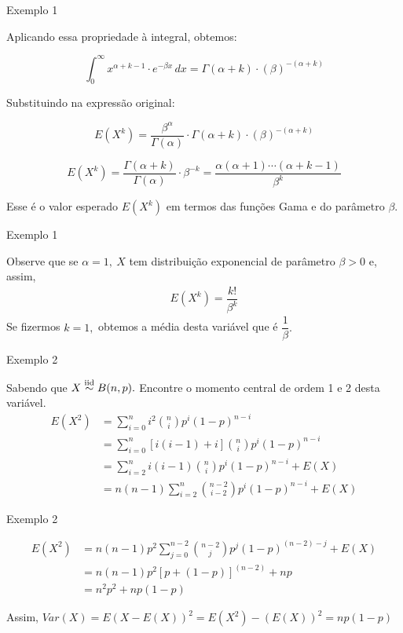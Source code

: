 \documentclass[12pt]{beamer}
\begin{document}
\begin{frame}{Exemplo 1}
\begin{block}{}
\justifying
Aplicando essa propriedade à integral, obtemos:

\[ \int_{0}^{\infty} x^{\alpha + k - 1} \cdot e^{-\beta x} \, dx = \Gamma(\alpha + k) \cdot (\beta)^{-(\alpha + k)} \]

Substituindo na expressão original:

\[E(X^k) = \frac{\beta^{\alpha}}{\Gamma(\alpha)} \cdot \Gamma(\alpha + k) \cdot (\beta)^{-(\alpha + k)} \]

\[E(X^k) = \frac{\Gamma(\alpha + k)}{\Gamma(\alpha)} \cdot \beta^{-k} = \dfrac{\alpha(\alpha+1)\cdots(\alpha+k-1)}{\beta^{k}}\]

Esse é o valor esperado \(E(X^k)\) em termos das funções Gama e do parâmetro \(\beta\).

\end{block}
\end{frame}

\begin{frame}{Exemplo 1}
\begin{block}{}
\justifying
Observe que se $\alpha=1,~X$ tem distribuição exponencial de parâmetro $\beta>0$ e, assim, 
\begin{align*}
 E(X^k) = \dfrac{k!}{\beta^{k}}   
\end{align*}
Se fizermos $k=1,$ obtemos a média desta variável que é $\dfrac{1}{\beta}.$
\end{block}
\end{frame}

\begin{frame}{Exemplo 2}
\begin{block}{}
\justifying
Sabendo que $X\overset{\text{iid}}{\sim} B(n,p).$ Encontre o momento central de ordem 1 e 2 desta variável.
\begin{align*}
    E(X^{2})&={\displaystyle \sum_{i=0}^{n}i^{2}\binom{n}{i}p^{i}(1-p)^{n-i}}\\
    &={\displaystyle \sum_{i=0}^{n}[i(i-1)+i]\binom{n}{i}p^{i}(1-p)^{n-i}}\\
    &={\displaystyle \sum_{i=2}^{n}i(i-1)\binom{n}{i}p^{i}(1-p)^{n-i}}+E(X)\\
    &={\displaystyle n(n-1)\sum_{i=2}^{n}\binom{n-2}{i-2}p^{i}(1-p)^{n-i}}+E(X)
\end{align*}
\end{block}
\end{frame}

\begin{frame}{Exemplo 2}
\begin{block}{}
\justifying
\begin{align*}
    E(X^{2})&={\displaystyle n(n-1)p^{2}\sum_{j=0}^{n-2}\binom{n-2}{j}p^{j}(1-p)^{(n-2)-j}}+E(X)\\
    &=n(n-1)p^{2}[p+(1-p)]^{(n-2)}+np\\
    &=n^{2}p^{2}+np(1-p)
\end{align*}
\end{block}
\pause
\begin{block}{}
\justifying
Assim, $Var(X)=E{(X-E(X))^{2}}=E(X^{2})-(E(X))^{2}=np(1-p)$
\end{block}
\end{frame}
\end{document}

